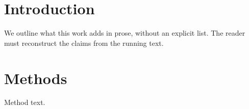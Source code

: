 \documentclass{article}
\begin{document}
\section{Introduction}
We outline what this work adds in prose, without an explicit list.
The reader must reconstruct the claims from the running text.
\section{Methods}
Method text.
\end{document}
